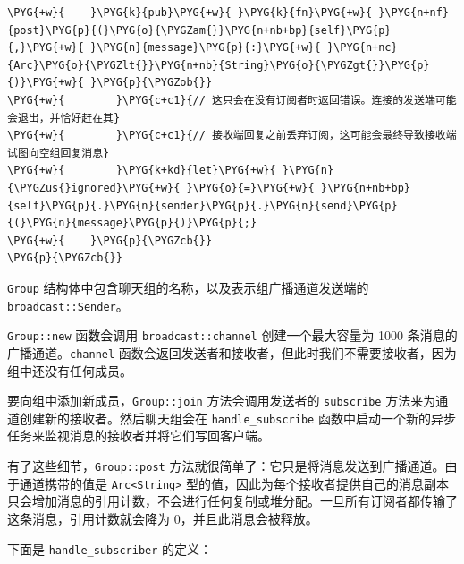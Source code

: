 \begin{Verbatim}[commandchars=\\\{\},breaklines=true,breakanywhere=true,fontsize=\codefont,xleftmargin=17bp]
\PYG{+w}{    }\PYG{k}{pub}\PYG{+w}{ }\PYG{k}{fn}\PYG{+w}{ }\PYG{n+nf}{post}\PYG{p}{(}\PYG{o}{\PYGZam{}}\PYG{n+nb+bp}{self}\PYG{p}{,}\PYG{+w}{ }\PYG{n}{message}\PYG{p}{:}\PYG{+w}{ }\PYG{n+nc}{Arc}\PYG{o}{\PYGZlt{}}\PYG{n+nb}{String}\PYG{o}{\PYGZgt{}}\PYG{p}{)}\PYG{+w}{ }\PYG{p}{\PYGZob{}}
\PYG{+w}{        }\PYG{c+c1}{// 这只会在没有订阅者时返回错误。连接的发送端可能会退出，并恰好赶在其}
\PYG{+w}{        }\PYG{c+c1}{// 接收端回复之前丢弃订阅，这可能会最终导致接收端试图向空组回复消息}
\PYG{+w}{        }\PYG{k+kd}{let}\PYG{+w}{ }\PYG{n}{\PYGZus{}ignored}\PYG{+w}{ }\PYG{o}{=}\PYG{+w}{ }\PYG{n+nb+bp}{self}\PYG{p}{.}\PYG{n}{sender}\PYG{p}{.}\PYG{n}{send}\PYG{p}{(}\PYG{n}{message}\PYG{p}{)}\PYG{p}{;}
\PYG{+w}{    }\PYG{p}{\PYGZcb{}}
\PYG{p}{\PYGZcb{}}
\end{Verbatim}

\texttt{Group} 结构体中包含聊天组的名称，以及表示组广播通道发送端的 \texttt{broadcast::Sender}。

\texttt{Group::new} 函数会调用 \texttt{broadcast::channel} 创建一个最大容量为 1000 条消息的广播通道。\texttt{channel} 函数会返回发送者和接收者，但此时我们不需要接收者，因为组中还没有任何成员。

要向组中添加新成员，\texttt{Group::join} 方法会调用发送者的 \texttt{subscribe} 方法来为通道创建新的接收者。然后聊天组会在 \texttt{handle\_subscribe} 函数中启动一个新的异步任务来监视消息的接收者并将它们写回客户端。

有了这些细节，\texttt{Group::post} 方法就很简单了：它只是将消息发送到广播通道。由于通道携带的值是 \texttt{Arc<String>} 型的值，因此为每个接收者提供自己的消息副本只会增加消息的引用计数，不会进行任何复制或堆分配。一旦所有订阅者都传输了这条消息，引用计数就会降为 0，并且此消息会被释放。

下面是 \texttt{handle\_subscriber} 的定义：

